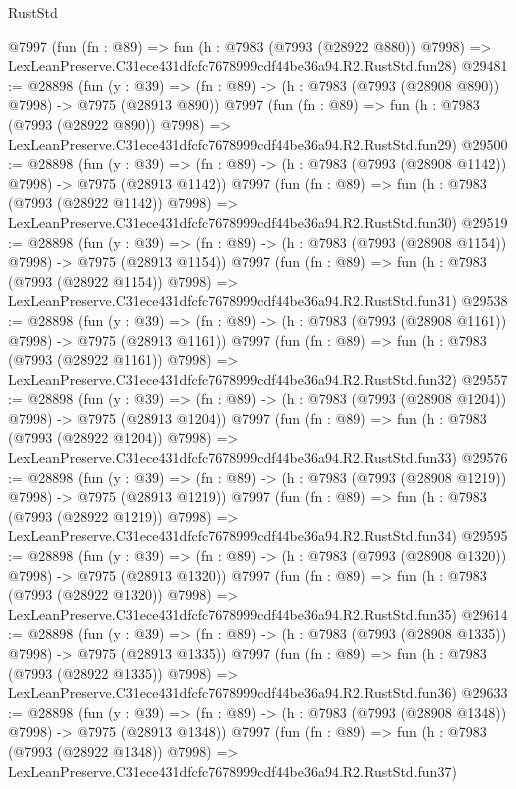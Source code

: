 \begin{lexlean}{RustStd}
\begin{coremodule}
    @7997
    (fun (fn : @89) =>
    fun (h : @7983 (@7993 (@28922 @880)) @7998) =>
    LexLeanPreserve.C31ece431dfcfc7678999cdf44be36a94.R2.RustStd.fun28)
@29481 := @28898
    (fun (y : @39) => (fn : @89) -> (h : @7983 (@7993 (@28908 @890)) @7998) -> @7975 (@28913 @890))
    @7997
    (fun (fn : @89) =>
    fun (h : @7983 (@7993 (@28922 @890)) @7998) =>
    LexLeanPreserve.C31ece431dfcfc7678999cdf44be36a94.R2.RustStd.fun29)
@29500 := @28898
    (fun (y : @39) =>
    (fn : @89) -> (h : @7983 (@7993 (@28908 @1142)) @7998) -> @7975 (@28913 @1142))
    @7997
    (fun (fn : @89) =>
    fun (h : @7983 (@7993 (@28922 @1142)) @7998) =>
    LexLeanPreserve.C31ece431dfcfc7678999cdf44be36a94.R2.RustStd.fun30)
@29519 := @28898
    (fun (y : @39) =>
    (fn : @89) -> (h : @7983 (@7993 (@28908 @1154)) @7998) -> @7975 (@28913 @1154))
    @7997
    (fun (fn : @89) =>
    fun (h : @7983 (@7993 (@28922 @1154)) @7998) =>
    LexLeanPreserve.C31ece431dfcfc7678999cdf44be36a94.R2.RustStd.fun31)
@29538 := @28898
    (fun (y : @39) =>
    (fn : @89) -> (h : @7983 (@7993 (@28908 @1161)) @7998) -> @7975 (@28913 @1161))
    @7997
    (fun (fn : @89) =>
    fun (h : @7983 (@7993 (@28922 @1161)) @7998) =>
    LexLeanPreserve.C31ece431dfcfc7678999cdf44be36a94.R2.RustStd.fun32)
@29557 := @28898
    (fun (y : @39) =>
    (fn : @89) -> (h : @7983 (@7993 (@28908 @1204)) @7998) -> @7975 (@28913 @1204))
    @7997
    (fun (fn : @89) =>
    fun (h : @7983 (@7993 (@28922 @1204)) @7998) =>
    LexLeanPreserve.C31ece431dfcfc7678999cdf44be36a94.R2.RustStd.fun33)
@29576 := @28898
    (fun (y : @39) =>
    (fn : @89) -> (h : @7983 (@7993 (@28908 @1219)) @7998) -> @7975 (@28913 @1219))
    @7997
    (fun (fn : @89) =>
    fun (h : @7983 (@7993 (@28922 @1219)) @7998) =>
    LexLeanPreserve.C31ece431dfcfc7678999cdf44be36a94.R2.RustStd.fun34)
@29595 := @28898
    (fun (y : @39) =>
    (fn : @89) -> (h : @7983 (@7993 (@28908 @1320)) @7998) -> @7975 (@28913 @1320))
    @7997
    (fun (fn : @89) =>
    fun (h : @7983 (@7993 (@28922 @1320)) @7998) =>
    LexLeanPreserve.C31ece431dfcfc7678999cdf44be36a94.R2.RustStd.fun35)
@29614 := @28898
    (fun (y : @39) =>
    (fn : @89) -> (h : @7983 (@7993 (@28908 @1335)) @7998) -> @7975 (@28913 @1335))
    @7997
    (fun (fn : @89) =>
    fun (h : @7983 (@7993 (@28922 @1335)) @7998) =>
    LexLeanPreserve.C31ece431dfcfc7678999cdf44be36a94.R2.RustStd.fun36)
@29633 := @28898
    (fun (y : @39) =>
    (fn : @89) -> (h : @7983 (@7993 (@28908 @1348)) @7998) -> @7975 (@28913 @1348))
    @7997
    (fun (fn : @89) =>
    fun (h : @7983 (@7993 (@28922 @1348)) @7998) =>
    LexLeanPreserve.C31ece431dfcfc7678999cdf44be36a94.R2.RustStd.fun37)

\end{coremodule}
\end{lexlean}
